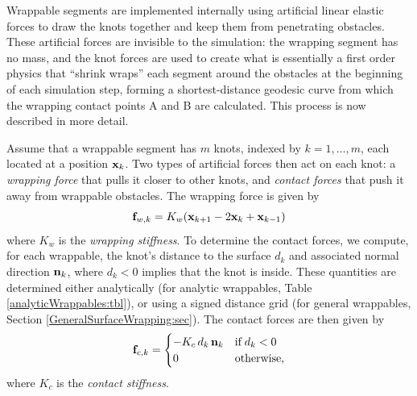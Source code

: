 Wrappable segments are implemented internally using artificial linear
elastic forces to draw the knots together and keep them from
penetrating obstacles. These artificial forces are invisible to the
simulation: the wrapping segment has no mass, and the knot forces are
used to create what is essentially a first order physics that ``shrink
wraps'' each segment around the obstacles at the beginning of each
simulation step, forming a shortest-distance geodesic curve from
which the wrapping contact points A and B are calculated. This process
is now described in more detail.

Assume that a wrappable segment has $m$ knots, indexed by $k =
1, \ldots, m$, each located at a position ${\bf x}_k$. Two types of
artificial forces then act on each knot: a {\it wrapping force}
that pulls it closer to other knots, and {\it contact forces} that
push it away from wrappable obstacles. The wrapping force is given by
%
\begin{equation*}
{\bf f}_{w,k} = K_w ({\bf x}_{k+1} - 2 {\bf x}_k + {\bf x}_{k-1})
\end{equation*}
%
where $K_w$ is the {\it wrapping stiffness}. To determine the contact
forces, we compute, for each wrappable, the knot's distance to the
surface $d_k$ and associated normal direction ${\bf n}_k$, where $d_k < 0$
implies that the knot is inside. These quantities are determined
either analytically (for analytic wrappables, Table
\ref{analyticWrappables:tbl}), or using a signed distance grid (for
general wrappables, Section \ref{GeneralSurfaceWrapping:sec}).  The
contact forces are then given by
%
\begin{equation*}
{\bf f}_{c,k} = 
\begin{cases}
-K_c \, d_k \, {\bf n}_k & \text{if} \; d_k < 0 \\
0 & \text{otherwise},
\end{cases}
\end{equation*}
%
where $K_c$ is the {\it contact stiffness}.

